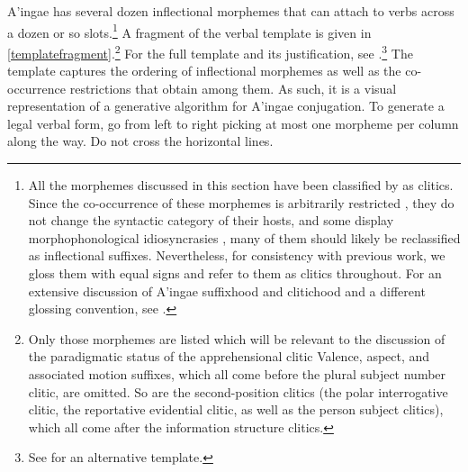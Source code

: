 \documentclass[output=paper,colorlinks,citecolor=brown]{langscibook}
\begin{document}
{A'ingae has several dozen inflectional morphemes that can attach to verbs across a dozen or so slots.}\footnote{All the morphemes discussed in this section have been classified by \citet{fischerhengeveld} as clitics. Since the co-occurrence of these morphemes is arbitrarily restricted \citep{zwicky1983cliticization}, they do not change the syntactic category of their hosts, and some display morphophonological idiosyncrasies \citep{dabkowski2019morphophonology}, many of them should likely be reclassified as inflectional suffixes. Nevertheless, for consistency with previous work, we gloss them with equal signs and refer to them as clitics throughout. For an extensive discussion of A'ingae suffixhood and clitichood and a different glossing convention, see \citet{dabkowski2019morphophonology}.} A fragment of the verbal template is given in \autoref{templatefragment}.\footnote{Only those morphemes are listed which will be relevant to the discussion of the paradigmatic status of the apprehensional clitic \sane[.] Valence, aspect, and associated motion suffixes, which all come before the plural subject  number clitic, are omitted. So are the second-position clitics (the polar interrogative  clitic, the reportative evidential  clitic, as well as the person subject clitics), which all come after the information structure clitics.} For the full template and its justification, see \citet{dabkowski2019morphophonology,dabkowski2021phonology,dabkowski2023nllt}.\footnote{{See \citet{fischerhengeveld} for an alternative template.}} The template captures the ordering of inflectional morphemes as well as the co-occurrence restrictions that obtain among them. As such, it is a visual representation of a generative algorithm for A'ingae conjugation. To generate a legal verbal form, go from left to right picking at most one morpheme per column along the way. Do not cross the horizontal lines.
\end{document}
